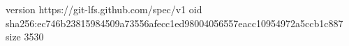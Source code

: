 version https://git-lfs.github.com/spec/v1
oid sha256:ec746b23815984509a73556afecc1ed98004056557eacc10954972a5ccb1c887
size 3530
